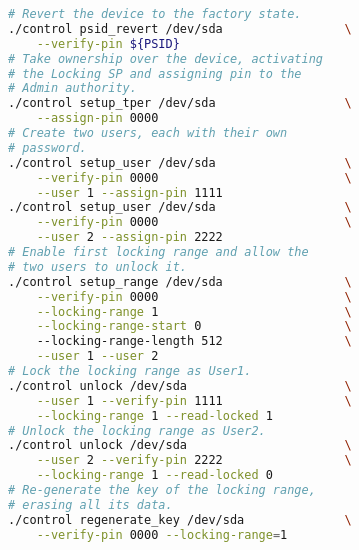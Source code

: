 



\begin{lstlisting}[language=bash,caption=Workflow with \texttt{control} utility,label={lst:control_workflow},keywordstyle=\color{black}]
# Revert the device to the factory state.
./control psid_revert /dev/sda                 \
    --verify-pin ${PSID}
# Take ownership over the device, activating 
# the Locking SP and assigning pin to the 
# Admin authority.
./control setup_tper /dev/sda                  \
    --assign-pin 0000
# Create two users, each with their own
# password.
./control setup_user /dev/sda                  \
    --verify-pin 0000                          \
    --user 1 --assign-pin 1111
./control setup_user /dev/sda                  \
    --verify-pin 0000                          \
    --user 2 --assign-pin 2222
# Enable first locking range and allow the 
# two users to unlock it.
./control setup_range /dev/sda                 \
    --verify-pin 0000                          \
    --locking-range 1                          \
    --locking-range-start 0                    \ 
    --locking-range-length 512                 \
    --user 1 --user 2
# Lock the locking range as User1.
./control unlock /dev/sda                      \
    --user 1 --verify-pin 1111                 \
    --locking-range 1 --read-locked 1
# Unlock the locking range as User2.
./control unlock /dev/sda                      \
    --user 2 --verify-pin 2222                 \
    --locking-range 1 --read-locked 0
# Re-generate the key of the locking range,
# erasing all its data.
./control regenerate_key /dev/sda              \
    --verify-pin 0000 --locking-range=1
\end{lstlisting}

